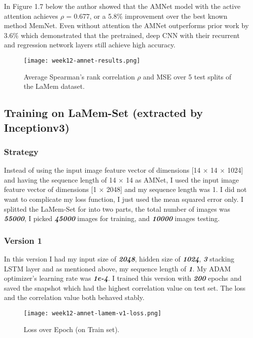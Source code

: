 In Figure 1.7 below the author showed that the AMNet model with the active attention achieves $\rho$ = 0.677, or a 5.8\% improvement over the best known method MemNet\cite{lamem}. Even without attention the AMNet outperforms prior work by 3.6\% which demonstrated that the pretrained, deep CNN with their recurrent and regression network layers still achieve high accuracy.

\begin{figure}[!ht]
\centering
\texttt{[image: week12-amnet-results.png]}
\caption{Average Spearman’s rank correlation $\rho$ and MSE over 5 test splits of the LaMem dataset.}
\end{figure}

\subsection{Training on LaMem-Set (extracted by Inceptionv3)}
\subsubsection{Strategy}
Instead of using the input image feature vector of dimensions [14 $\times$ 14 $\times$ 1024] and having the sequence length of 14 $\times$ 14 as AMNet, I used the input image feature vector of dimensions [1 $\times$ 2048] and my sequence length was 1. I did not want to complicate my loss function, I just used the mean squared error only. I splitted the LaMem-Set for into two parts, the total number of images was \textbf{\emph{55000}}, I picked \textbf{\emph{45000}} images for training, and \textbf{\emph{10000}} images testing.

\subsubsection{Version 1}
In this version I had my input size of \textbf{\emph{2048}}, hidden size of \textbf{\emph{1024}}, \textbf{\emph{3}} stacking LSTM layer and as mentioned above, my sequence length of \textbf{\emph{1}}. My ADAM optimizer's learning rate was \textbf{\emph{1e-4}}. I trained this version with \textbf{\emph{200}} epochs and saved the snapshot which had the highest correlation value on test set. The loss and the correlation value both behaved stably.

\begin{figure}[!ht]
\centering
\texttt{[image: week12-amnet-lamem-v1-loss.png]}
\caption{Loss over Epoch (on Train set).}
\end{figure}

